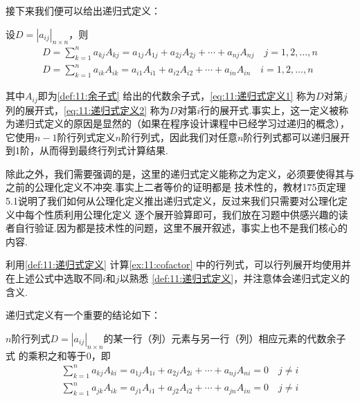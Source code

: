 接下来我们便可以给出递归式定义：
\begin{definition} \label{def:11:递归式定义}
    设$D=|a_{ij}|_{n \times n}$，则
    \begin{gather}
        \label{eq:11:递归式定义1}
        D=\sum_{k=1}^{n}a_{kj}A_{kj}=a_{1j}A_{1j}+a_{2j}A_{2j}+\cdots+a_{nj}A_{nj} \quad j=1,2,\ldots,n \\
        \label{eq:11:递归式定义2}
        D=\sum_{k=1}^{n}a_{ik}A_{ik}=a_{i1}A_{i1}+a_{i2}A_{i2}+\cdots+a_{in}A_{in} \quad i=1,2,\ldots,n
    \end{gather}
\end{definition}
其中$A_{ij}$即为\autoref{def:11:余子式} 给出的代数余子式，\autoref{eq:11:递归式定义1} 称为$D$对第$j$列的展开式，\autoref{eq:11:递归式定义2}
称为$D$对第$i$行的展开式.事实上，这一定义被称为递归式定义的原因是显然的（如果在程序设计课程中已经学习过递归的概念），
它使用$n-1$阶行列式定义$n$阶行列式，因此我们对任意$n$阶行列式都可以递归展开到1阶，从而得到最终行列式计算结果.

除此之外，我们需要强调的是，这里的递归式定义能称之为定义，必须要使得其与之前的公理化定义不冲突.事实上二者等价的证明都是
技术性的，教材175页定理5.1说明了我们如何从公理化定义推出递归式定义，反过来我们只需要对公理化定义中每个性质利用公理化定义
逐个展开验算即可，我们放在习题中供感兴趣的读者自行验证.因为都是技术性的问题，这里不展开叙述，事实上也不是我们核心的内容.
\begin{example} \label{ex:11:递归式定义}
    利用\autoref{def:11:递归式定义} 计算\autoref{ex:11:cofactor} 中的行列式，可以行列展开均使用并在上述公式中选取不同$i$和$j$以熟悉
    \autoref{def:11:递归式定义}，并注意体会递归式定义的含义.
\end{example}
\begin{solution}

\end{solution}

递归式定义有一个重要的结论如下：
\begin{theorem}
    $n$阶行列式$D=|a_{ij}|_{n \times n}$的某一行（列）元素与另一行（列）相应元素的代数余子式
    的乘积之和等于0，即
    \begin{gather}
        \label{eq:11:递归式定义3}
        \sum_{k=1}^{n}a_{kj}A_{ki}=a_{1j}A_{1i}+a_{2j}A_{2i}+\cdots+a_{nj}A_{ni}=0 \quad j \neq i \\
        \label{eq:11:递归式定义4}
        \sum_{k=1}^{n}a_{jk}A_{ik}=a_{j1}A_{i1}+a_{j2}A_{i2}+\cdots+a_{jn}A_{in}=0 \quad j \neq i
    \end{gather}
\end{theorem}

